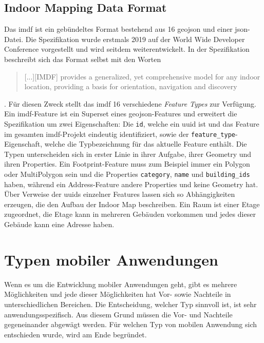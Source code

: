 \subsection{Indoor Mapping Data Format}
Das \ac{imdf} ist ein gebündeltes Format bestehend aus 16 \ac{geojson} und einer \ac{json}-Datei.
Die Spezifikation wurde erstmals 2019 auf der World Wide Developer Conference vorgestellt \parencite{GOD2019} und wird seitdem weiterentwickelt.
In der Spezifikation beschreibt sich das Format selbst mit den Worten \blockquote{[...][IMDF] provides a generalized, yet comprehensive model for any indoor location, providing a basis for orientation, navigation and discovery} \parencite{HOA2019}.\pbreak%
%
Für diesen Zweck stellt das \ac{imdf} 16 verschiedene \textit{Feature Types} zur Verfügung.
Ein \ac{imdf}-Feature ist ein Superset eines \ac{geojson}-Features und erweitert die Spezifikation um zwei Eigenschaften:
Die \texttt{id}, welche ein \ac{uuid} ist und das Feature im gesamten \ac{imdf}-Projekt eindeutig identifiziert, sowie der \texttt{feature\_type}-Eigenschaft, welche die Typbezeichnung für das aktuelle Feature enthält.
Die Typen unterscheiden sich in erster Linie in ihrer Aufgabe, ihrer Geometry und ihren Properties.
Ein Footprint-Feature muss zum Beispiel immer ein Polygon oder MultiPolygon sein und die Properties \texttt{category}, \texttt{name} und \texttt{building\_ids} haben, während ein Address-Feature andere Properties und keine Geometry hat.\pbreak%
%
Über Verweise der \ac{uuid}s einzelner Features lassen sich so Abhängigkeiten erzeugen, die den Aufbau der Indoor Map beschreiben.
Ein Raum ist einer Etage zugeordnet, die Etage kann in mehreren Gebäuden vorkommen und jedes dieser Gebäude kann eine Adresse haben.

\section{Typen mobiler Anwendungen}
Wenn es um die Entwicklung mobiler Anwendungen geht, gibt es mehrere Möglichkeiten und jede dieser Möglichkeiten hat Vor- sowie Nachteile in unterschiedlichen Bereichen.
Die Entscheidung, welcher Typ sinnvoll ist, ist sehr anwendungsspezifisch.
Aus diesem Grund müssen die Vor- und Nachteile gegeneinander abgewägt werden.
Für welchen Typ von mobilen Anwendung sich entschieden wurde, wird am Ende begründet.

